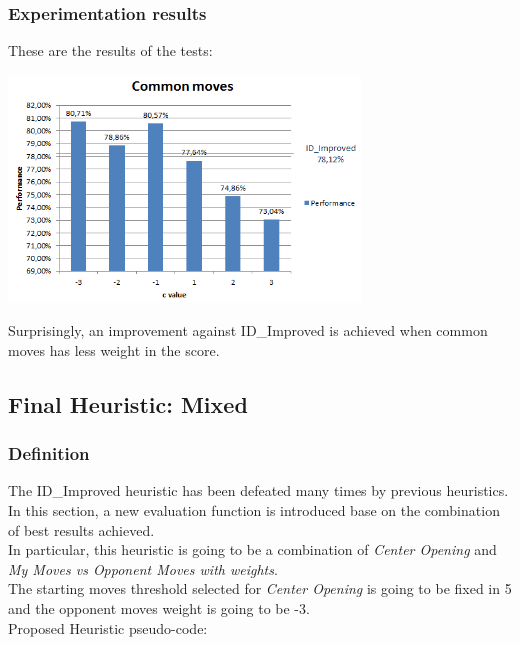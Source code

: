 \documentclass[10pt, a4paper,english]{article}
\begin{document}
\subsubsection{Experimentation results}

These are the results of the tests:

\begin{center}
\includegraphics[width=0.7\textwidth]{commonmoves.png}\\
\end{center}

Surprisingly, an improvement against ID\_Improved is achieved when common moves has less weight in the score.

\subsection{Final Heuristic: Mixed}

\subsubsection{Definition}

The ID\_Improved heuristic has been defeated many times by previous heuristics. In this section, a new evaluation function is introduced base on the combination of best results achieved. \\

In particular, this heuristic is going to be a combination of \textit{Center Opening} and \textit{My Moves vs Opponent Moves with weights}. \\

The starting moves threshold selected for \textit{Center Opening} is going to be fixed in 5 and the opponent moves weight is going to be -3. \\

Proposed Heuristic pseudo-code:\\
\end{document}

